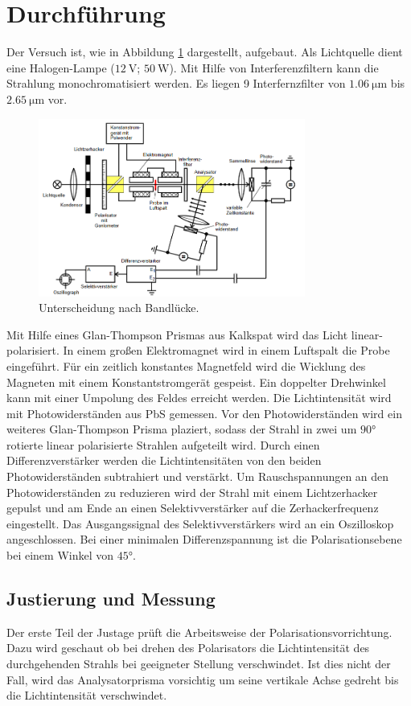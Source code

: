 \section{Durchführung}
\label{sec:Durchführung}
Der Versuch ist, wie in Abbildung \ref{pic:aufbau} dargestellt, aufgebaut. 
Als Lichtquelle dient eine Halogen-Lampe ($\SI{12}{\volt}$; $\SI{50}{\watt}$).
Mit Hilfe von Interferenzfiltern kann die Strahlung monochromatisiert werden.
Es liegen 9 Interfernzfilter von $\SI{1.06}{\micro\meter}$ bis $\SI{2.65}{\micro\meter}$ vor.
\begin{figure}
    \centering
    \includegraphics[width = 0.78\textwidth]{pics/aufbau.png}
    \caption{Unterscheidung nach Bandlücke.\cite{Anleitung}}
    \label{pic:aufbau}
\end{figure}
Mit Hilfe eines Glan-Thompson Prismas aus Kalkspat wird das Licht linear-polarisiert. In einem großen Elektromagnet wird in einem Luftspalt die Probe eingeführt.
Für ein zeitlich konstantes Magnetfeld wird die Wicklung des Magneten mit einem Konstantstromgerät gespeist.
Ein doppelter Drehwinkel kann mit einer Umpolung des Feldes erreicht werden.
Die Lichtintensität wird mit Photowiderständen aus PbS gemessen. 
Vor den Photowiderständen wird ein weiteres Glan-Thompson Prisma plaziert, sodass der Strahl in zwei um $\ang{90}$ rotierte linear polarisierte Strahlen aufgeteilt wird.
Durch einen Differenzverstärker werden die Lichtintensitäten von den beiden Photowiderständen subtrahiert und verstärkt.
Um Rauschspannungen an den Photowiderständen zu reduzieren wird der Strahl mit einem Lichtzerhacker
gepulst und am Ende an einen Selektivverstärker auf die Zerhackerfrequenz eingestellt.
Das Ausgangssignal des Selektivverstärkers wird an ein Oszilloskop angeschlossen.
Bei einer minimalen Differenzspannung ist die Polarisationsebene bei einem Winkel von $\ang{45}$. 

\subsection{Justierung und Messung}
Der erste Teil der Justage prüft die Arbeitsweise der Polarisationsvorrichtung. 
Dazu wird geschaut ob bei drehen des Polarisators die Lichtintensität des durchgehenden Strahls bei geeigneter Stellung verschwindet. 
Ist dies nicht der Fall, wird das Analysatorprisma vorsichtig um seine vertikale Achse gedreht bis die Lichtintensität verschwindet.

